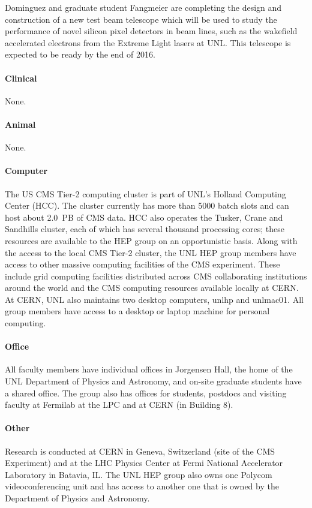 \documentclass[11pt]{article}
\begin{document}
Dominguez and graduate student Fangmeier are completing the design and construction of a new test beam telescope which will be used to study the performance of novel silicon pixel detectors in beam lines, such as the wakefield accelerated electrons from the Extreme Light lasers at UNL.  This telescope is expected to be ready by the end of 2016.

\paragraph{Clinical} None.

\paragraph{Animal} None.

\paragraph{Computer} The US CMS Tier-2 computing cluster is part of UNL's
Holland Computing Center (HCC).  The cluster currently has more than 5000 batch slots and can host about 2.0~PB of CMS data.
HCC also operates the Tusker, Crane and Sandhills cluster, each of which has several thousand
processing cores; these resources are available to the HEP group on an
opportunistic basis. Along with the access to the local CMS Tier-2 cluster,
the UNL HEP group members have access to other massive computing facilities
of the CMS experiment. These include grid computing facilities distributed
across CMS collaborating institutions around the world and the CMS
computing resources available locally at CERN. At CERN, UNL also maintains two
desktop computers, unlhp and unlmac01. All group members have access to a 
desktop or laptop machine for personal computing.

\paragraph{Office} All faculty members have individual offices in Jorgensen
Hall, the home of the UNL Department of Physics and Astronomy, and on-site
graduate students have a shared office.  The group also has offices for
students, postdocs and visiting faculty at Fermilab at the LPC and at CERN (in Building 8).

\paragraph{Other} Research is conducted at CERN in Geneva, Switzerland
(site of the CMS Experiment) and at the LHC Physics Center at Fermi National Accelerator Laboratory in Batavia, IL. The UNL HEP group also owns one Polycom
videoconferencing unit and has access to another one that is owned by the
Department of Physics and Astronomy.
\end{document}
